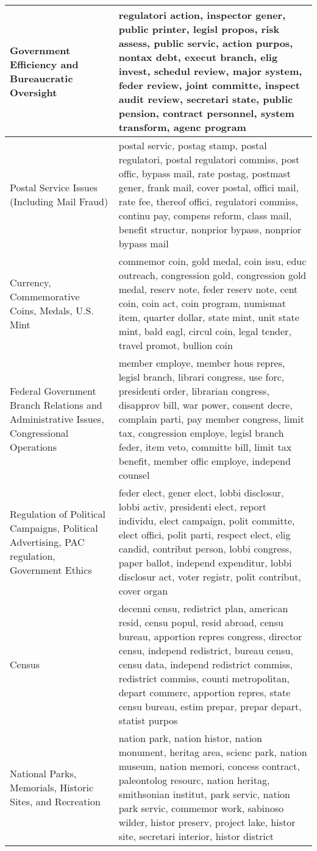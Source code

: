 \begin{longtable}{p{}p{}}
   \hline
Government Efficiency and Bureaucratic Oversight & regulatori action, inspector gener, public printer, legisl propos, risk assess, public servic, action purpos, nontax debt, execut branch, elig invest, schedul review, major system, feder review, joint committe, inspect audit review, secretari state, public pension, contract personnel, system transform, agenc program \\ 
   \hline
Postal Service Issues (Including Mail Fraud) & postal servic, postag stamp, postal regulatori, postal regulatori commiss, post offic, bypass mail, rate postag, postmast gener, frank mail, cover postal, offici mail, rate fee, thereof offici, regulatori commiss, continu pay, compens reform, class mail, benefit structur, nonprior bypass, nonprior bypass mail \\ 
   \hline
Currency, Commemorative Coins, Medals, U.S. Mint & commemor coin, gold medal, coin issu, educ outreach, congression gold, congression gold medal, reserv note, feder reserv note, cent coin, coin act, coin program, numismat item, quarter dollar, state mint, unit state mint, bald eagl, circul coin, legal tender, travel promot, bullion coin \\ 
   \hline
Federal Government Branch Relations and Administrative Issues, Congressional Operations & member employe, member hous repres, legisl branch, librari congress, use forc, presidenti order, librarian congress, disapprov bill, war power, consent decre, complain parti, pay member congress, limit tax, congression employe, legisl branch feder, item veto, committe bill, limit tax benefit, member offic employe, independ counsel \\ 
   \hline
Regulation of Political Campaigns, Political Advertising, PAC regulation, Government Ethics & feder elect, gener elect, lobbi disclosur, lobbi activ, presidenti elect, report individu, elect campaign, polit committe, elect offici, polit parti, respect elect, elig candid, contribut person, lobbi congress, paper ballot, independ expenditur, lobbi disclosur act, voter registr, polit contribut, cover organ \\ 
   \hline
Census & decenni censu, redistrict plan, american resid, censu popul, resid abroad, censu bureau, apportion repres congress, director censu, independ redistrict, bureau censu, censu data, independ redistrict commiss, redistrict commiss, counti metropolitan, depart commerc, apportion repres, state censu bureau, estim prepar, prepar depart, statist purpos \\ 
   \hline
National Parks, Memorials, Historic Sites, and Recreation & nation park, nation histor, nation monument, heritag area, scienc park, nation museum, nation memori, concess contract, paleontolog resourc, nation heritag, smithsonian institut, park servic, nation park servic, commemor work, sabinoso wilder, histor preserv, project lake, histor site, secretari interior, histor district \\ 

\end{longtable}
